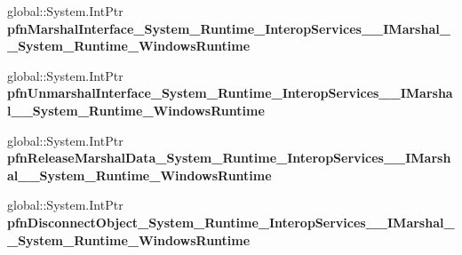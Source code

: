 \begin{DoxyCompactItemize}
\item 
\mbox{\label{struct_system_1_1_runtime_1_1_interop_services_1_1_i_marshal_____system___runtime___windows_runtime_____impl_1_1_vtbl_a765d50da9c9b759c3d00889639b511b7}} 
global\+::\+System.\+Int\+Ptr {\bfseries pfn\+Marshal\+Interface\+\_\+\+System\+\_\+\+Runtime\+\_\+\+Interop\+Services\+\_\+\+\_\+\+I\+Marshal\+\_\+\+\_\+\+System\+\_\+\+Runtime\+\_\+\+Windows\+Runtime}
\item 
\mbox{\label{struct_system_1_1_runtime_1_1_interop_services_1_1_i_marshal_____system___runtime___windows_runtime_____impl_1_1_vtbl_aaaa182f30f109553bdef757a50488adf}} 
global\+::\+System.\+Int\+Ptr {\bfseries pfn\+Unmarshal\+Interface\+\_\+\+System\+\_\+\+Runtime\+\_\+\+Interop\+Services\+\_\+\+\_\+\+I\+Marshal\+\_\+\+\_\+\+System\+\_\+\+Runtime\+\_\+\+Windows\+Runtime}
\item 
\mbox{\label{struct_system_1_1_runtime_1_1_interop_services_1_1_i_marshal_____system___runtime___windows_runtime_____impl_1_1_vtbl_ace5b8a96f8bc82b1848f9b71d5923fe1}} 
global\+::\+System.\+Int\+Ptr {\bfseries pfn\+Release\+Marshal\+Data\+\_\+\+System\+\_\+\+Runtime\+\_\+\+Interop\+Services\+\_\+\+\_\+\+I\+Marshal\+\_\+\+\_\+\+System\+\_\+\+Runtime\+\_\+\+Windows\+Runtime}
\item 
\mbox{\label{struct_system_1_1_runtime_1_1_interop_services_1_1_i_marshal_____system___runtime___windows_runtime_____impl_1_1_vtbl_a2edb23ffd767545b29555499aad35a57}} 
global\+::\+System.\+Int\+Ptr {\bfseries pfn\+Disconnect\+Object\+\_\+\+System\+\_\+\+Runtime\+\_\+\+Interop\+Services\+\_\+\+\_\+\+I\+Marshal\+\_\+\+\_\+\+System\+\_\+\+Runtime\+\_\+\+Windows\+Runtime}
\end{DoxyCompactItemize}
